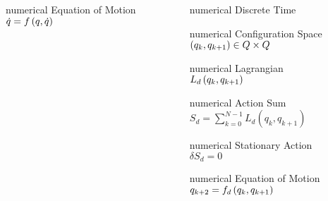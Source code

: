\begin{frame}
\begin{columns}[c]
\begin{column}{0.5\textwidth}
			\begin{beamercolorbox}[wd=0.8\columnwidth,sep=0.05cm,center]{numerical} 
				Equation of Motion \\
				\( \dot{q} = f \left( q, \dot{q}  \right) \)
			\end{beamercolorbox}
		\end{column}
		\begin{column}{0.5\textwidth}
			\centering
			\begin{beamercolorbox}[wd=0.8\columnwidth,sep=0.05cm,center]{numerical} Discrete Time \end{beamercolorbox}
			\begin{beamercolorbox}[wd=0.8\columnwidth,sep=0.05cm,center]{numerical} 
				Configuration Space \\
				\( \left( q_k, q_{k+1}  \right) \in Q \times Q \)
			\end{beamercolorbox}
			\begin{beamercolorbox}[wd=0.8\columnwidth,sep=0.05cm,center]{numerical} 
				Lagrangian \\
				\( L_d\left( q_k, q_{k+1} \right) \)
			\end{beamercolorbox}
			\begin{beamercolorbox}[wd=0.8\columnwidth,sep=0.05cm,center]{numerical} 
				Action Sum \\
				\( S_d = \sum_{k=0}^{N-1} L_d(q_k, q_{k+1}) \)
			\end{beamercolorbox}
			\begin{beamercolorbox}[wd=0.8\columnwidth,sep=0.05cm,center]{numerical} 
				Stationary Action \\
				\( \delta S_d = 0 \)
			\end{beamercolorbox}
			\begin{beamercolorbox}[wd=0.8\columnwidth,sep=0.05cm,center]{numerical} 
				Equation of Motion \\
				\( q_{k+2} = f_d \left( q_k, q_{k+1}  \right) \)
			\end{beamercolorbox}
		\end{column}
	\end{columns}

\end{frame}%

